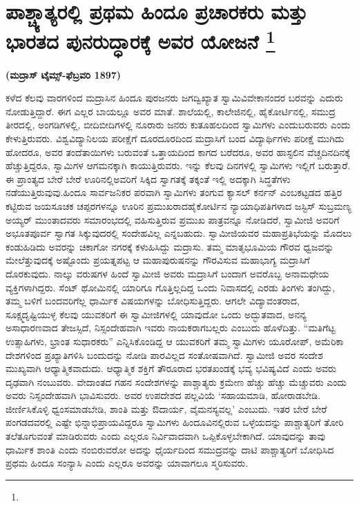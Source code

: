 
\vspace{-0.7cm}

\chapter[ಪಾಶ್ಚ್ಯಾತ್ಯರಲ್ಲಿ ಪ್ರಥಮ ಹಿಂದೂ ಪ್ರಚಾರಕರು ಮತ್ತು ಭಾರತದ ಪುನರುದ್ಧಾರಕ್ಕೆ ಅವರ ಯೋಜನೆ ]{ಪಾಶ್ಚ್ಯಾತ್ಯರಲ್ಲಿ ಪ್ರಥಮ ಹಿಂದೂ ಪ್ರಚಾರಕರು ಮತ್ತು ಭಾರತದ ಪುನರುದ್ಧಾರಕ್ಕೆ ಅವರ ಯೋಜನೆ \protect\footnote{}}

\centerline{\textbf{(ಮದ್ರಾಸ್​ ಟೈಮ್ಸ್-ಫೆಬ್ರವರಿ 1897)}}

\vskip 0.2cm

ಕಳೆದ ಕೆಲವು ವಾರಗಳಿಂದ ಮದ್ರಾಸಿನ ಹಿಂದೂ ಪುರಜನರು ಜಗದ್ವಿಖ್ಯಾತ ಸ್ವಾಮಿ\break ವಿವೇಕಾನಂದರ ಬರವನ್ನು ಎದುರು ನೋಡುತ್ತಿದ್ದಾರೆ. ಈಗ ಎಲ್ಲರ ಬಾಯಲ್ಲೂ ಅವರ ಮಾತೆ. ಶಾಲೆಯಲ್ಲಿ, ಕಾಲೇಜಿನಲ್ಲಿ, ಹೈಕೋರ್ಟಿನಲ್ಲಿ, ಸಮುದ್ರ ತೀರದಲ್ಲಿ, ಅಂಗಡಿಗಳಲ್ಲಿ, ಬೀದಿಬೀದಿಗಳಲ್ಲಿ ನೂರಾರು ಜನರು ಕುತೂಹಲದಿಂದ ಸ್ವಾಮಿಗಳು ಎಂದು\break ಬರುವರು ಎಂದು ಕೇಳುತ್ತಿರುವರು. ವಿಶ್ವವಿದ್ಯಾನಿಲಯ ಪರೀಕ್ಷೆಗೆ ದೂರದೂರದಿಂದ ಮದ್ರಾಸಿಗೆ ಬಂದ ವಿದ್ಯಾರ್ಥಿಗಳು ಪರೀಕ್ಷೆ ಮುಗಿದು ಹೋದರೂ, ಅವರ ತಂದೆ\break ತಾಯಿಗಳು ಬರುವಂತೆ ಒತ್ತಾಯದಿಂದ ಕಾಗದ ಬರೆದರೂ, ಅವರ ಹಾಸ್ಟಲಿನ ವೆಚ್ಚ\break ದಿನದಿನಕ್ಕೆ ಹೆಚ್ಚುತ್ತಿದ್ದರೂ, ಸ್ವಾಮಿಗಳ ಆಗಮನಕ್ಕಾಗಿ ಕಾಯುತ್ತಿರುವರು. ಇನ್ನು ಕೆಲವು ದಿನಗಳಲ್ಲಿ ಸ್ವಾಮಿಗಳು ಇಲ್ಲಿಗೆ ಬರುತ್ತಾರೆ. ಈ ಪ್ರಾಂತ್ಯದ ಬೇರೆ ಬೇರೆ ಊರಿನಲ್ಲಿ\break ಅವರಿಗೆ ಸಿಕ್ಕಿದ ಸ್ವಾಗತಕ್ಕೆ ತಕ್ಕಂತೆ ಇಲ್ಲಿ ಅದಕ್ಕಾಗಿ ಸಿದ್ಧತೆಗಳು ನಡೆಯುತ್ತಿರುವುವು.\break ಹಿಂದೂ ಸಾರ್ವಜನಿಕರ ಪರವಾಗಿ ಸ್ವಾಮಿಗಳು ತಂಗುವ ಕ್ಯಾಸಲ್​ ಕರ್ನನ್​ ಎಂಬ\break ಕಟ್ಟಡದ ಹತ್ತಿರ ಕಟ್ಟಿರುವ ಜಯಸೂಚಕ ಚಪ್ಪರಗಳನ್ನೂ ಊರಿನ ಪ್ರಮುಖರಾದ\break ಹೈಕೋರ್ಟಿನ ನ್ಯಾಯಾಧಿಪತಿಗಳಾದ ಜಸ್ಟಿಸ್​ ಸುಬ್ರಮಣ್ಯ ಅಯ್ಯರ್​ ಮುಂತಾದವರು ಸಮಾರಂಭದಲ್ಲಿ ವಹಿಸುತ್ತಿರುವ ಪ್ರಮುಖ ಪಾತ್ರವನ್ನೂ ನೋಡಿದರೆ, ಸ್ವಾಮೀಜಿ ಅವರಿಗೆ ಅಭೂತಪೂರ್ವ ಸ್ವಾಗತ ಸಿಕ್ಕುವುದರಲ್ಲಿ ಸಂದೇಹವಿಲ್ಲ ಎನ್ನಬಹುದು. ಸ್ವಾಮೀಜಿಯವರ ಮಹಾಪ್ರತಿಭೆಯನ್ನು ಮೊದಲು ಕಂಡುಹಿಡಿದು ಅವರನ್ನು ಚಿಕಾಗೋ ನಗರಕ್ಕೆ ಕಳುಹಿಸಿದ್ದು ಮದ್ರಾಸು. ತಮ್ಮ ಮಾತೃಭೂಮಿಯ ಗೌರವ ಧ್ವಜವನ್ನು ಮೇಲೆತ್ತುವುದಕ್ಕೆ ಅಷ್ಟೊಂದು ಪ್ರಯತ್ನಪಟ್ಟ ಆ ಮಹಾಪುರುಷನನ್ನು ಗೌರವಿಸುವ ಮಹಾಭಾಗ್ಯ ಮದ್ರಾಸಿಗೆ ದೊರಕುವುದು. ನಾಲ್ಕು ವರುಷಗಳ ಹಿಂದೆ ಸ್ವಾಮೀಜಿ ಅವರು ಮದ್ರಾಸಿಗೆ ಬಂದಾಗ ಅವರೊಬ್ಬ ಅನಾಮಧೇಯ ವ್ಯಕ್ತಿಗಳಾಗಿದ್ದರು. ಸೆಂಟ್​ ಥೋಮಿನಲ್ಲಿ ಯಾರಿಗೂ ಗೊತ್ತಿಲ್ಲದಿದ್ದ ಒಂದು ನಿವಾಸದಲ್ಲಿ ಎರಡು ತಿಂಗಳು ತಂಗಿದ್ದು, ತಮ್ಮ ಬಳಿಗೆ ಬಂದವರಿಗೆಲ್ಲ ಧಾರ್ಮಿಕ ವಿಷಯಗಳನ್ನು ಬೋಧಿಸುತ್ತಿದ್ದರು. ಆಗಲೇ ವಿದ್ಯಾವಂತರಾದ, ಸೂಕ್ಷ್ಮದೃಷ್ಟಿಯುಳ್ಳ ಕೆಲವು ಯುವಕರಿಗೆ ಈ ಸ್ವಾಮೀಜಿಗಳಲ್ಲಿ ಯಾವುದೋ ಒಂದು ಅದ್ಭುತವಾದ, ಅನನ್ಯ ಅಸಾಧಾರಣವಾದ ತೇಜಸ್ಸಿದೆ, ನಿಸ್ಸಂದೇಹವಾಗಿ ಇವರು ನಾಯಕರಾಗಬಲ್ಲರು ಎಂಬುದು ಹೊಳೆದಿತ್ತು. “ಮತಿಗೆಟ್ಟ ಉತ್ಸಾಹಿಗಳು, ಭ್ರಾಂತ ಸುಧಾರಕರು” ಎನ್ನಿಸಿಕೊಂಡಿದ್ದ ಆ ಯುವಕರಿಗೆ ತಮ್ಮ ಸ್ವಾಮಿಗಳು ಯೂರೋಪ್​, ಅಮೆರಿಕಾ ದೇಶಗಳಿಂದ ಪ್ರಖ್ಯಾತಿಗಳಿಸಿ ಬಂದುದನ್ನು ನೋಡಿ ಪಾರವಿಲ್ಲದ ಸಂತೋಷವಾಗಿದೆ. ಸ್ವಾಮೀಜಿ ಅವರ ಸಂದೇಶ ಮುಖ್ಯವಾಗಿ ಆಧ್ಯಾತ್ಮಿಕವಾದುದು. ಆಧ್ಯಾತ್ಮಿಕ ಶಕ್ತಿಗೆ ತೌರೂರಾದ ಭರತಖಂಡಕ್ಕೆ ಭವ್ಯ ಭವಿಷ್ಯವಿದೆ ಎಂದು ಅವರು ದೃಢವಾಗಿ ನಂಬುವರು. ವೇದಾಂತದ ಗಹನ ಸಂದೇಶಗಳನ್ನು ಪಾಶ್ಚಾತ್ಯರು ಕ್ರಮೇಣ ಹೆಚ್ಚು ಹೆಚ್ಚು ಮೆಚ್ಚುವರು ಎಂದು ಅವರು ನಿಸ್ಸಂದೇಹವಾಗಿ ಭಾವಿಸುವರು. ಅವರ ಉಪದೇಶದ ಪಲ್ಲವಿಯೆ ‘ಸಹಾಯಮಾಡಿ, ಹೋರಾಡಬೇಡಿ. ಜೀರ್ಣಿಸಿಕೊಳ್ಳಿ ಧ್ವಂಸಮಾಡಬೇಡಿ, ಶಾಂತಿ ಮತ್ತು ಔದಾರ್ಯ, ವೈಮನಸ್ಯವಲ್ಲ’ ಎಂಬುದು. ಇತರ ಬೇರೆ ಬೇರೆ ಪಂಗಡದವರಲ್ಲಿ ಎಷ್ಟೇ ಭಿನ್ನಾಭಿಪ್ರಾಯವಿದ್ದರೂ ಸ್ವಾಮಿಗಳು ಹಿಂದೂವಿನಲ್ಲಿರುವ ಒಳ್ಳೆಯದನ್ನು ಪಾಶ್ಚಾತ್ಯರಿಗೆ ತೋರಿ ತಲೆತೂಗುವಂತೆ ಮಾಡಿರುವರು ಎಂದು ಎಲ್ಲರೂ ನಿರ್ವಿವಾದವಾಗಿ ಒಪ್ಪಿಕೊಳ್ಳಬೇಕಾಗಿದೆ. ಯಾವುದನ್ನು ತಾವು ಧಾರ್ಮಿಕ ಶಾಂತಿ ಎಂದು ನಂಬಿರುವರೋ ಅದನ್ನು ಧೈರ್ಯದಿಂದ ಸಮುದ್ರವನ್ನು ದಾಟಿ ಪಾಶ್ಚಾತ್ಯರಿಗೆ ಬೋಧಿಸಿದ ಪ್ರಥಮ ಹಿಂದೂ ಸಂನ್ಯಾಸಿ ಎಂದು ಎಲ್ಲರೂ ಅವರನ್ನು ಯಾವಾಗಲೂ ಸ್ಮರಿಸುವರು.

